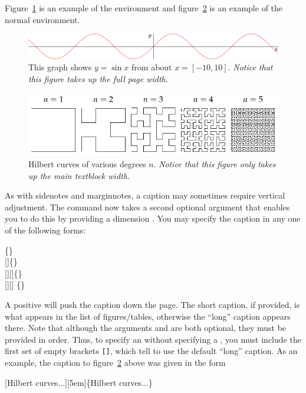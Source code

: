 Figure~\ref{fig:fullfig} is an example of the 
environment and figure~\ref{fig:textfig} is an example of the normal
 environment.

\begin{figure}[h]
  \includegraphics[width=\linewidth]{images/sine.pdf}%
  \caption{This graph shows $y = \sin x$ from about $x = [-10, 10]$.
  \emph{Notice that this figure takes up the full page width.}}%
  \label{fig:fullfig}%
\end{figure}

\begin{figure}
  \includegraphics{images/hilbertcurves.pdf}
  \caption{Hilbert curves of various degrees $n$. \emph{Notice that this figure only takes up the main textblock width.}}
  \label{fig:textfig}
\end{figure}

As with sidenotes and marginnotes, a caption may sometimes require vertical
adjustment. The  command now takes a second optional
argument that enables you to do this by providing a dimension .
You may specify the caption in any one of the following forms:
\begin{docspec}
  \{\}\\
  []\{\}\\
  [][]\{\}\\
  [][]%
                  \{\}
\end{docspec}
A positive  will push the caption down the page. The short
caption, if provided, is what appears in the list of figures/tables, otherwise
the ``long'' caption appears there. Note that although the arguments
 and  are both optional, they must be
provided in order. Thus, to specify an  without specifying a
, you must include the first set of empty brackets
\Verb|[]|, which tell  to use the default ``long'' caption. As
an example, the caption to figure~\ref{fig:textfig} above was given in the form
\begin{docspec}
  [Hilbert curves...][5em]\{Hilbert curves...\}
\end{docspec}


